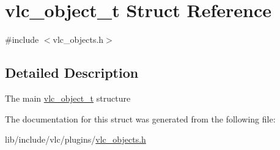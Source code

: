 \hypertarget{structvlc__object__t}{}\section{vlc\+\_\+object\+\_\+t Struct Reference}
\label{structvlc__object__t}


{\ttfamily \#include $<$vlc\+\_\+objects.\+h$>$}



\subsection{Detailed Description}
The main \hyperlink{structvlc__object__t}{vlc\+\_\+object\+\_\+t} structure 

The documentation for this struct was generated from the following file\+:\begin{DoxyCompactItemize}
\item 
lib/include/vlc/plugins/\hyperlink{vlc__objects_8h}{vlc\+\_\+objects.\+h}\end{DoxyCompactItemize}
